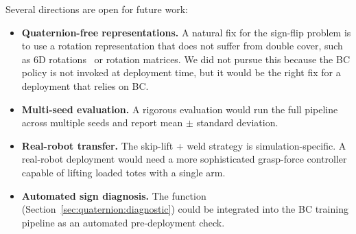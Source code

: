 Several directions are open for future work:
\begin{itemize}[leftmargin=*,itemsep=2pt]
    \item \textbf{Quaternion-free representations.} A natural fix for the sign-flip problem is to use a rotation representation that does not suffer from double cover, such as 6D rotations~\cite{zhou2019continuity} or rotation matrices. We did not pursue this because the BC policy is not invoked at deployment time, but it would be the right fix for a deployment that relies on BC.
    \item \textbf{Multi-seed evaluation.} A rigorous evaluation would run the full pipeline across multiple seeds and report mean $\pm$ standard deviation.
    \item \textbf{Real-robot transfer.} The skip-lift + weld strategy is simulation-specific. A real-robot deployment would need a more sophisticated grasp-force controller capable of lifting loaded totes with a single arm.
    \item \textbf{Automated sign diagnosis.} The  function (Section~\ref{sec:quaternion:diagnostic}) could be integrated into the BC training pipeline as an automated pre-deployment check.
\end{itemize}
